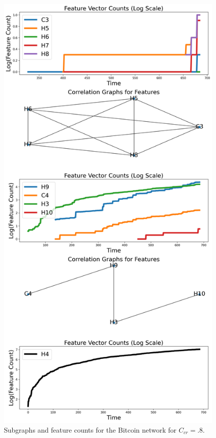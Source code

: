 \documentclass[a4paper,11pt]{article}
\begin{document}
\begin{figure}[h!]
\centering
\includegraphics[width=.8\linewidth]{Images/Bitcoin/connected_components}
\caption{Subgraphs and feature counts for the Bitcoin network for $C_{cr}=.8$.}
\label{fig:featuresbitcoin}
\end{figure}
\clearpage
\pagebreak
\end{document}
